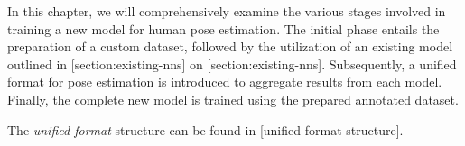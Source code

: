 In this chapter, we will comprehensively examine the various stages involved in training a new model for human pose estimation. The initial phase entails the preparation of a custom dataset, followed by the utilization of an existing model outlined in [section:existing-nns] on [section:existing-nns]. Subsequently, a unified format for pose estimation is introduced to aggregate results from each model. Finally, the complete new model is trained using the prepared annotated dataset.


The {\em unified format} structure can be found in [unified-format-structure].


